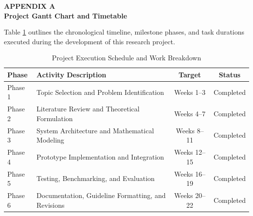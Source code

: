 \clearpage
\begin{center}
{\fontsize{14pt}{17pt}\selectfont\textbf{APPENDIX A}} \\
\vspace{0.5\baselineskip}
{\fontsize{12pt}{15pt}\selectfont\textbf{Project Gantt Chart and Timetable}}
\end{center}

\vspace{1\baselineskip}

\begin{singlespace}
\noindent
Table \ref{tab:gantt_schedule} outlines the chronological timeline, milestone phases, and task durations executed during the development of this research project.

\begin{table}[htbp]
\centering
\caption{Project Execution Schedule and Work Breakdown}
\label{tab:gantt_schedule}
\small
\begin{tabular}{p{1.8cm}p{6.8cm}cc}
\toprule[1.5pt]
\textbf{Phase} & \textbf{Activity Description} & \textbf{Target} & \textbf{Status} \\
\midrule[1.0pt]
Phase 1 & Topic Selection and Problem Identification & Weeks 1--3 & Completed \\
Phase 2 & Literature Review and Theoretical Formulation & Weeks 4--7 & Completed \\
Phase 3 & System Architecture and Mathematical Modeling & Weeks 8--11 & Completed \\
Phase 4 & Prototype Implementation and Integration & Weeks 12--15 & Completed \\
Phase 5 & Testing, Benchmarking, and Evaluation & Weeks 16--19 & Completed \\
Phase 6 & Documentation, Guideline Formatting, and Revisions & Weeks 20--22 & Completed \\
\bottomrule[1.5pt]
\end{tabular}
\end{table}
\end{singlespace}
